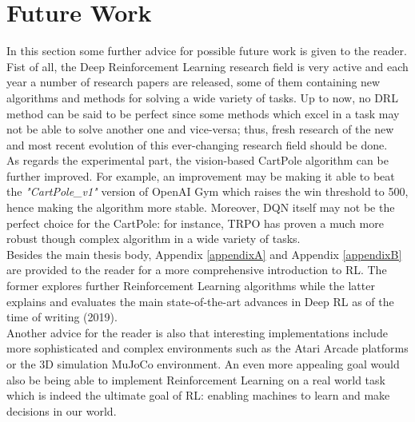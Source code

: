 \section{Future Work}

In this section some further advice for possible future work is given to the reader.
\\
\indent Fist of all, the Deep Reinforcement Learning research field is very active and each year a number of research papers are released, some of them containing new algorithms and methods for solving a wide variety of tasks. Up to now, no DRL method can be said to be perfect since some methods which excel in a task may not be able to solve another one and vice-versa; thus, fresh research of the new and most recent evolution of this ever-changing research field should be done.
\\
\indent As regards the experimental part, the vision-based CartPole algorithm can be further improved. For example, an improvement may be making it able to beat the \textit{"CartPole\_v1"} version of OpenAI Gym which raises the win threshold to 500, hence making the algorithm more stable. Moreover, DQN itself may not be the perfect choice for the CartPole: for instance, TRPO has proven a much more robust though complex algorithm in a wide variety of tasks.
\\
\indent Besides the main thesis body, Appendix \ref{appendixA} and Appendix \ref{appendixB} are provided to the reader for a more comprehensive introduction to RL. The former explores further Reinforcement Learning algorithms while the latter explains and evaluates the main state-of-the-art advances in Deep RL as of the time of writing (2019).
\\
\indent Another advice for the reader is also that interesting implementations include more sophisticated and complex environments such as the Atari Arcade platforms or the 3D simulation MuJoCo environment. An even more appealing goal would also be being able to implement Reinforcement Learning on a real world task which is indeed the ultimate goal of RL: enabling machines to learn and make decisions in our world.